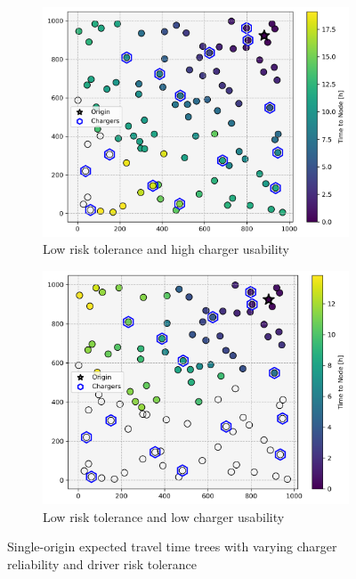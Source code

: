 \documentclass[12pt]{article}
\begin{document}
\begin{figure}[H]
\begin{subfigure}{.5\linewidth}
		\centering\includegraphics[width = \linewidth]{figs/parameter_factorial_10.png}
		\captionsetup{width=.8\linewidth}
		\caption{Low risk tolerance and high charger usability}
	\end{subfigure}%
	\begin{subfigure}{.5\linewidth}
		\centering\includegraphics[width = \linewidth]{figs/parameter_factorial_11.png}
		\captionsetup{width=.8\linewidth}
		\caption{Low risk tolerance and low charger usability}
	\end{subfigure}
	\caption{Single-origin expected travel time trees with varying charger reliability and driver risk tolerance}
	\label{fig:routing}
\end{figure}
\end{document}
